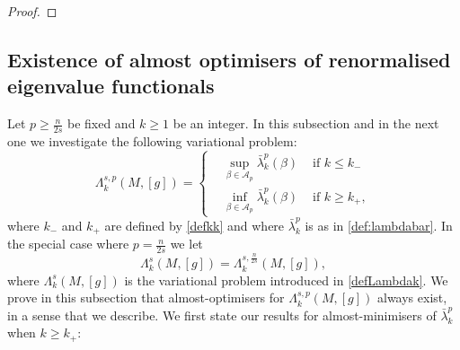 \documentclass[10pt]{amsart}
\numberwithin{equation}{section}
\newcommand{\R}{\mathbb{R}}
\def\La{{\Lambda}}
\def\be{{\beta}}
\def\ep{{\varepsilon}}
\def \ep{\epsilon}
\theoremstyle{plain}
\theoremstyle{remark}
\begin{document}
\begin{proof}
%
%
%
\end{proof}

\subsection{Existence of almost optimisers of renormalised eigenvalue functionals}

Let $p \ge \frac{n}{2s}$ be fixed and $k \ge 1$ be an integer. In this subsection and in the next one we investigate the following variational problem: 
\begin{equation} \label{Lasouscritique}
\La_k^{s,p}(M,[g])=\left \{
\begin{aligned}
& \sup_{\be \in \mathcal{A}_p}  \bar{\lambda}_k^p(\beta) & \text{ if } k \le k_{-} \\
& \inf_{\be \in \mathcal{A}_p}  \bar{\lambda}_k^p(\beta) & \text{ if } k \ge k_{+}, 
\end{aligned}
\right. 
\end{equation}
where $k_{-}$ and $k_+$ are defined by \eqref{defkk} and where $\bar{\lambda}_k^p$ is as in \eqref{def:lambdabar}. In the special case where $p=\frac{n}{2s}$ we let 
$$\La_k^s(M,[g]) =\Lambda_k^{s,\frac{n}{2s}}(M,[g]),$$
where $\La_k^s(M,[g])$ is the variational problem introduced in \eqref{defLambdak}.  We prove in this subsection that almost-optimisers for $\La_k^{s,p}(M,[g])$ always exist, in a sense that we describe. We first state our results for almost-minimisers of $\bar{\lambda}_k^{p}$ when $k \ge k_+$:
\end{document}
